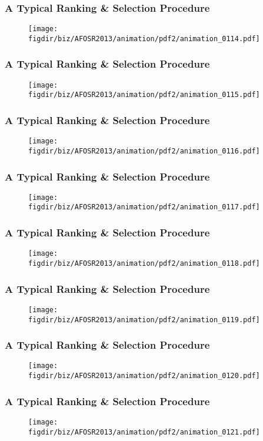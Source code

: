 \documentclass[13pt]{beamer}
\newcommand{\figdir}{../../fig}
\begin{document}
{\begin{frame}\frametitle{A Typical Ranking \& Selection Procedure}\begin{figure}\texttt{[image: \\figdir/biz/AFOSR2013/animation/pdf2/animation\_0114.pdf]}\end{figure}\end{frame}
\begin{frame}\frametitle{A Typical Ranking \& Selection Procedure}\begin{figure}\texttt{[image: \\figdir/biz/AFOSR2013/animation/pdf2/animation\_0115.pdf]}\end{figure}\end{frame}
\begin{frame}\frametitle{A Typical Ranking \& Selection Procedure}\begin{figure}\texttt{[image: \\figdir/biz/AFOSR2013/animation/pdf2/animation\_0116.pdf]}\end{figure}\end{frame}
\begin{frame}\frametitle{A Typical Ranking \& Selection Procedure}\begin{figure}\texttt{[image: \\figdir/biz/AFOSR2013/animation/pdf2/animation\_0117.pdf]}\end{figure}\end{frame}
\begin{frame}\frametitle{A Typical Ranking \& Selection Procedure}\begin{figure}\texttt{[image: \\figdir/biz/AFOSR2013/animation/pdf2/animation\_0118.pdf]}\end{figure}\end{frame}
\begin{frame}\frametitle{A Typical Ranking \& Selection Procedure}\begin{figure}\texttt{[image: \\figdir/biz/AFOSR2013/animation/pdf2/animation\_0119.pdf]}\end{figure}\end{frame}
\begin{frame}\frametitle{A Typical Ranking \& Selection Procedure}\begin{figure}\texttt{[image: \\figdir/biz/AFOSR2013/animation/pdf2/animation\_0120.pdf]}\end{figure}\end{frame}
\begin{frame}\frametitle{A Typical Ranking \& Selection Procedure}\begin{figure}\texttt{[image: \\figdir/biz/AFOSR2013/animation/pdf2/animation\_0121.pdf]}\end{figure}\end{frame}
}
\end{document}
